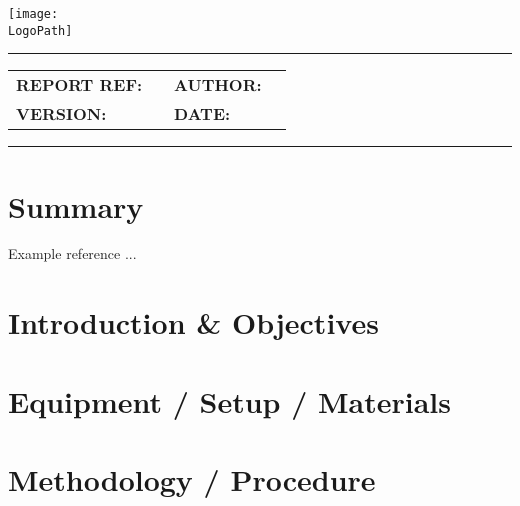 \documentclass[10pt]{article}
\makeatletter
\newcommand{\customtitle}{%
  \noindent
  \begin{minipage}[t]{0.65\textwidth}
    \vspace{-0.5cm}
    {\ocrfamily\Large\bfseries \DocumentType \par}
  \end{minipage}%
  \begin{minipage}[t]{0.35\textwidth}
    \flushright{}
    \texttt{[image: \\LogoPath]}
  \end{minipage}

  \vspace{0.3cm}
  \hrule height 0.8pt
  \vspace{0.3cm}

  {\ocrfamily\bfseries\ProjectFullRef\par}
  {\ocrfamily\large\bfseries\ReportTitle\par}

  \vspace{0.5em}

  \begin{tabular}{@{}ll@{\hspace{2cm}}ll@{}}
    \ocrfamily\textbf{REPORT REF:} & \ocrfamily \ReportRef &
    \ocrfamily\textbf{AUTHOR:}     & \ocrfamily \AuthorName \\

    \ocrfamily\textbf{VERSION:}    & \ocrfamily \DocVersion &
    \ocrfamily\textbf{DATE:}       & \ocrfamily \ReleaseDate \\
  \end{tabular}

  \vspace{0.3cm}
  \hrule height 0.8pt
  \vspace{0.25cm}
}
\makeatother
\begin{document}
\vspace*{-1cm}
\thispagestyle{plain}
\customtitle{}



\section{Summary}

Example reference \cite{hibbeler2016mechanics}...

\section{Introduction \& Objectives}

\section{Equipment / Setup / Materials} %

\section{Methodology / Procedure}
\end{document}
